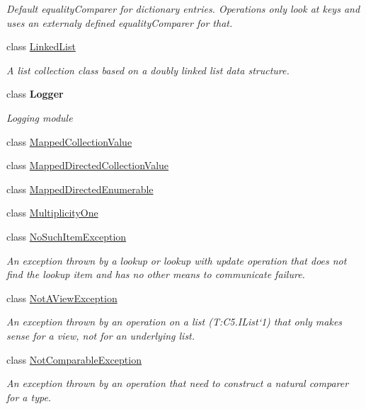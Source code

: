 \begin{DoxyCompactItemize}
\begin{DoxyCompactList}\small\item\em Default equality\+Comparer for dictionary entries. Operations only look at keys and uses an externaly defined equality\+Comparer for that. \end{DoxyCompactList}\item 
class \hyperlink{class_c5_1_1_linked_list}{Linked\+List}
\begin{DoxyCompactList}\small\item\em A list collection class based on a doubly linked list data structure. \end{DoxyCompactList}\item 
class {\bfseries Logger}
\begin{DoxyCompactList}\small\item\em Logging module \end{DoxyCompactList}\item 
class \hyperlink{class_c5_1_1_mapped_collection_value}{Mapped\+Collection\+Value}
\item 
class \hyperlink{class_c5_1_1_mapped_directed_collection_value}{Mapped\+Directed\+Collection\+Value}
\item 
class \hyperlink{class_c5_1_1_mapped_directed_enumerable}{Mapped\+Directed\+Enumerable}
\item 
class \hyperlink{class_c5_1_1_multiplicity_one}{Multiplicity\+One}
\item 
class \hyperlink{class_c5_1_1_no_such_item_exception}{No\+Such\+Item\+Exception}
\begin{DoxyCompactList}\small\item\em An exception thrown by a lookup or lookup with update operation that does not find the lookup item and has no other means to communicate failure. \end{DoxyCompactList}\item 
class \hyperlink{class_c5_1_1_not_a_view_exception}{Not\+A\+View\+Exception}
\begin{DoxyCompactList}\small\item\em An exception thrown by an operation on a list (T\+:\+C5.\+I\+List`1) that only makes sense for a view, not for an underlying list. \end{DoxyCompactList}\item 
class \hyperlink{class_c5_1_1_not_comparable_exception}{Not\+Comparable\+Exception}
\begin{DoxyCompactList}\small\item\em An exception thrown by an operation that need to construct a natural comparer for a type. \end{DoxyCompactList}\item 

\end{DoxyCompactItemize}
